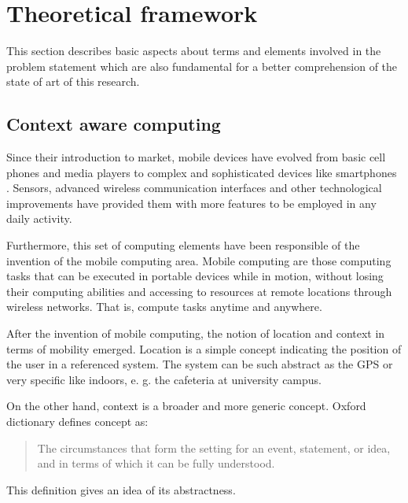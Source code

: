 \section{Theoretical framework} 
\label{sec:theoretical_framework}

This section describes basic aspects about terms and elements involved in the problem statement which are also fundamental for a better comprehension of the state of art of this research.

\subsection{Context aware computing}
\label{sub:context_aware_computing}

Since their introduction to market, mobile devices have evolved from basic cell phones and media players to complex and sophisticated devices like smartphones \cite{Charlesworth2009,Schmidt2011}.
Sensors, advanced wireless communication interfaces and other technological improvements have provided them with more features to be employed in any daily activity.

Furthermore, this set of computing elements have been responsible of the invention of the mobile computing area.
Mobile computing are those computing tasks that can be executed in portable devices while in motion, without losing their computing abilities and accessing to resources at remote locations through wireless networks.
That is, compute tasks anytime and anywhere.

After the invention of mobile computing, the notion of location and context in terms of mobility emerged. 
Location is a simple concept indicating the position of the user in a referenced system. 
The system can be such abstract as the GPS or very specific like indoors, e. g. the cafeteria at university campus.

On the other hand, context is a broader and more generic concept.
Oxford dictionary defines concept as:
\begin{quotation}
  The circumstances that form the setting for an event, statement, or idea, and in terms of which it can be fully understood.
\end{quotation}
This definition gives an idea of its abstractness.

